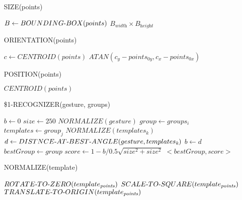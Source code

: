 \begin{algorithm}
  \caption*{SIZE(points)}
  \begin{algorithmic}[1]
  \State $B\gets BOUNDING\mathchar`-BOX(points)$
  \Return $B_\textit{width} \times B_\textit{height}$
\end{algorithmic}
\end{algorithm}

\begin{algorithm}
  \caption*{ORIENTATION(points)}
  \begin{algorithmic}[1]
  \State $c\gets CENTROID(points)$
  \Return $ATAN(c_\textit{y} - points_\textit{0y}, c_\textit{x} - points_\textit{0x})$
\end{algorithmic}
\end{algorithm}

\begin{algorithm}
  \caption*{POSITION(points)}
  \begin{algorithmic}[1]
  \Return $CENTROID(points)$
\end{algorithmic}
\end{algorithm}

\begin{algorithm}
  \caption*{\$1-RECOGNIZER(gesture, groups)}
  \begin{algorithmic}[1]
  \State $b\gets 0$
  \State $size\gets 250$
  \State $NORMALIZE(gesture)$
  	\State $group\gets groups_\textit{i}$
		\State $templates\gets group_\textit{j}$
			\State $NORMALIZE(templates_\textit{k})$
			\State $d\gets DISTNCE\mathchar`-AT\mathchar`-BEST\mathchar`-ANGLE(gesture, templates_\textit{k})$ 
				\State $b\gets d$
				\State $bestGroup\gets group$
			\EndIf
		\EndFor
	\EndFor
  \EndFor
  \State $score\gets 1 - b / 0.5\sqrt{size^2 + size^2}$
  \Return $<bestGroup, score>$
\end{algorithmic}
\end{algorithm}

\begin{algorithm}
  \caption*{NORMALIZE(template)}
  \begin{algorithmic}[1]
  \State $ROTATE\mathchar`-TO\mathchar`-ZERO(template_\textit{points})$ 
  \State $SCALE\mathchar`-TO\mathchar`-SQUARE(template_\textit{points})$ 
  \State $TRANSLATE\mathchar`-TO\mathchar`-ORIGIN(template_\textit{points})$ 
\end{algorithmic}
\end{algorithm}


